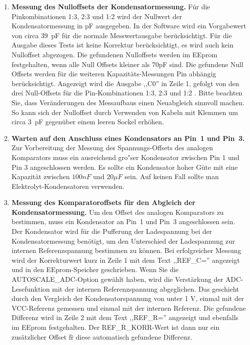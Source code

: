 \begin{enumerate}
\item {\bf Messung des Nulloffsets der Kondensatormessung.}
F\"ur die Pinkombinationen 1:3, 2:3 und 1:2 wird der Nullwert der Kondensatormessung in pF ausgegeben.
In der Software wird ein Vorgabewert von circa 39~pF f\"ur die normale Messwertausgabe ber\"ucksichtigt.
F\"ur die Ausgabe dieses Tests ist keine Korrektur ber\"ucksichtigt, es wird auch kein Nulloffset abgezogen.
Die gefundenen Nulloffsets werden im EEprom festgehalten, wenn alle Null Offsets kleiner als 70pF sind.
Die gefundene Null Offsets werden f\"ur die weiteren Kapazit\"ats-Messungen Pin abh\"angig ber\"ucksichtigt.
Angezeigt wird  die Ausgabe ,,C0''  in Zeile 1, gefolgt von den drei Null-Offsets f\"ur
die Pin-Kombinationen 1:3, 2:3 und 1:2 .
Bitte beachten Sie, dass Ver\"anderungen des Messaufbaus einen Neuabgleich sinnvoll machen.
So kann sich der Nulloffset durch Verwenden von Kabeln mit Klemmen um circa 3~pF gegen\"uber einem leeren
Sockel erh\"ohen.

\item {\bf Warten auf den Anschluss eines Kondensators an Pin~1 und Pin~3.}
Zur Vorbereitung der Messung des Spannungs-Offsets des analogen Komparators muss ein ausreichend gro"ser
Kondensator zwischen Pin 1 und Pin 3 angeschlossen werden.
Es sollte ein Kondensator hoher G\"ute mit eine Kapazit\"at zwischen \(100 nF\) und \(20 \mu F\) sein. 
Auf keinen Fall sollte man Elektrolyt-Kondensatoren verwenden.


\item {\bf Messung des Komparatoroffsets f\"ur den Abgleich der Kondensatormessung.}
Um den Offset des analogen Komparators zu bestimmen, muss ein Kondensator an Pin~1 und Pin~3 angeschlossen sein.
Der Kondensator wird f\"ur die Pufferung der Ladespannung bei der Kondensatormessung ben\"otigt, um den Unterschied der 
Ladespannung zur internen Referenzspannung bestimmen zu k\"onnen.
Bei erfolgreicher Messung wird der Korrekturwert kurz in Zeile 1 mit dem Text ,,REF\_C='' angezeigt und in den EEprom-Speicher geschrieben.
Wenn Sie die AUTOSCALE\_ADC-Option gew\"ahlt haben, wird die Verst\"arkung der ADC-Lesefunktion mit der
internen Referenzspannung abgeglichen. Das geschieht durch den Vergleich der Kondensatorspannung von unter 1 V, einmal mit
der VCC-Referenz gemessen und einmal mit der internen Referenz.
Die gefundene Differenz wird in Zeile 2 mit dem Text ,,REF\_R='' angezeigt und ebenfalls im EEprom festgehalten.
Der REF\_R\_KORR-Wert ist dann nur ein zus\"atzlicher Offset f\"r diese automatisch gefundene Differenz.

\end{enumerate}

